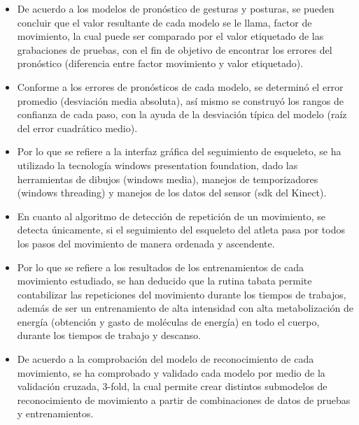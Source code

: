 \begin{itemize}
\item De acuerdo a los modelos de pron\'ostico de gesturas y  posturas, se pueden concluir que el valor resultante de cada modelo se le llama, factor de movimiento, la cual puede ser comparado por el valor etiquetado de las grabaciones de pruebas, con el fin de objetivo de encontrar los errores del pron\'ostico (diferencia entre factor movimiento y valor etiquetado).
\item Conforme a los errores de pron\'osticos de cada modelo, se determin\'o el error promedio (desviaci\'on media absoluta), as\'i mismo se construy\'o los rangos de confianza de cada paso, con la ayuda de la desviaci\'on t\'ipica del modelo (ra\'iz del error cuadr\'atico medio).
\item Por lo que se refiere a la interfaz gr\'afica del seguimiento de esqueleto, se ha utilizado la tecnolog\'ia windows presentation foundation, dado  las herramientas de dibujos (windows media), manejos de temporizadores (windows threading) y manejos de los datos del sensor (sdk del Kinect).
\item En cuanto al algoritmo de detecci\'on de repetici\'on de un movimiento, se detecta \'unicamente, si el seguimiento del esqueleto del atleta pasa por todos los pasos del movimiento de manera ordenada y ascendente.
\item Por lo que se refiere a los resultados de los entrenamientos de cada movimiento estudiado, se han deducido que la rutina tabata permite contabilizar las repeticiones del movimiento durante los tiempos de trabajos, adem\'as de ser un entrenamiento de alta intensidad con alta metabolizaci\'on de energ\'ia (obtenci\'on y gasto de mol\'eculas de energ\'ia) en todo el cuerpo, durante los tiempos de trabajo y descanso.
\item De acuerdo a la comprobaci\'on del modelo de reconocimiento de cada movimiento, se ha comprobado y validado cada modelo por medio de la validaci\'on  cruzada, 3-fold, la cual permite crear distintos submodelos de reconocimiento de movimiento a partir de  combinaciones de datos de pruebas y entrenamientos.
\end{itemize}